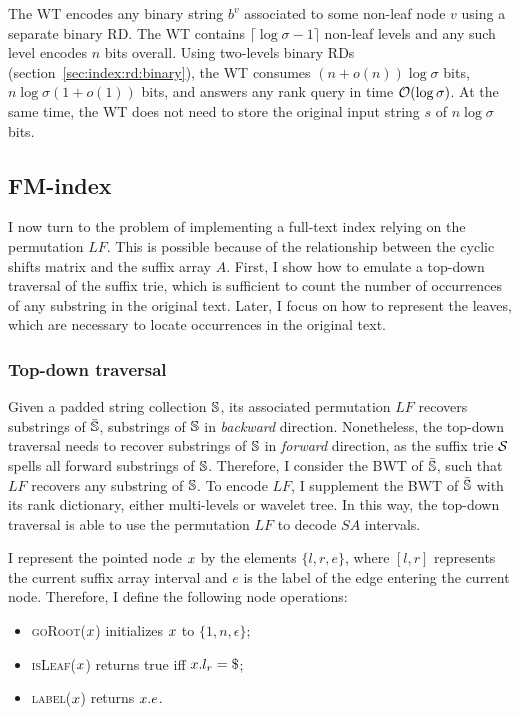 The WT encodes any binary string $b^v$ associated to some non-leaf node $v$ using a separate binary RD.
The WT contains $\lceil \log \sigma - 1 \rceil$ non-leaf levels and any such level encodes $n$ bits overall.
Using two-levels binary RDs (section~\ref{sec:index:rd:binary}), the WT consumes $(n + o(n)) \log \sigma$ bits, \ie $n \log \sigma (1 + o(1))$ bits, and answers any rank query in time $\mathcal{O}(\log{\sigma})$.
At the same time, the WT does not need to store the original input string $s$ of $n \log \sigma$ bits.

\subsection{FM-index}
\label{sub:fmtrie}

I now turn to the problem of implementing a full-text index relying on the permutation $LF$.
This is possible because of the relationship between the cyclic shifts matrix and the suffix array $A$.
First, I show how to emulate a top-down traversal of the suffix trie, which is sufficient to count the number of occurrences of any substring in the original text.
Later, I focus on how to represent the leaves, which are necessary to locate occurrences in the original text.

\subsubsection{Top-down traversal}

Given a padded string collection $\mathbb {S}$, its associated permutation $LF$ recovers substrings of $\bar{\mathbb {S}}$, \ie substrings of $\mathbb {S}$ in \emph{backward} direction.
Nonetheless, the top-down traversal needs to recover substrings of $\mathbb {S}$ in \emph{forward} direction, as the suffix trie $\mathcal {S}$ spells all forward substrings of $\mathbb {S}$.
Therefore, I consider the BWT of $\bar{\mathbb {S}}$, such that $LF$ recovers any substring of $\mathbb {S}$.
To encode $LF$, I supplement the BWT of $\bar{\mathbb {S}}$ with its rank dictionary, either multi-levels or wavelet tree.
In this way, the top-down traversal is able to use the permutation $LF$ to decode $SA$ intervals.

I represent the pointed node $x$ by the elements $\{ l, r, e \}$, where $[l,r]$ represents the current suffix array interval and $e$ is the label of the edge entering the current node.
Therefore, I define the following node operations:
\begin{itemize}
\item \textsc{goRoot}($x$) initializes $x$ to $\{ 1, n, \epsilon \}$;
\item \textsc{isLeaf}($x$) returns true iff $\Tn.l_r = \$$;
\item \textsc{label}($x$) returns $x.e$.
\end{itemize}

